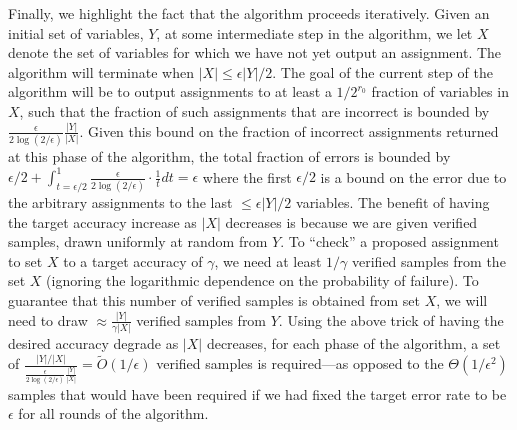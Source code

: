 \documentclass[final,12pt]{colt2018}
\newcommand{\eps}{\epsilon}
\begin{document}
Finally, we highlight the fact that the algorithm proceeds iteratively.  Given an initial set of variables, $Y$, at some intermediate step in the algorithm, we let $X$ denote the set of variables for which we have not yet output an assignment.   The algorithm will terminate when $|X| \le \eps |Y|/2$.  The goal of the current step of the algorithm will be to output assignments to at least a $1/2^{r_0}$ fraction of variables in $X$, such that the fraction of such assignments that are incorrect is bounded by $\frac{\eps}{2\log(2/\eps)} \frac{|Y|}{|X|}.$  Given this bound on the fraction of incorrect assignments returned at this phase of the algorithm, the total fraction of errors is  bounded by $\eps/2 + \int_{t=\eps/2}^1 \frac{\eps}{2\log(2/\eps)}\cdot \frac{1}{t} dt = \eps$  where the first $\eps/2$ is a bound on the error due to the arbitrary assignments to the last $\le \eps |Y|/2$ variables.    The benefit of having the target accuracy increase as $|X|$ decreases is because we are given verified samples, drawn uniformly at random from $Y$.  To ``check'' a proposed assignment to set $X$ to a target accuracy of $\gamma$, we need at least $1/\gamma$ verified samples from the set $X$  (ignoring the logarithmic dependence on the probability of failure).  To guarantee that this number of verified samples is obtained from set $X$, we will need to draw $\approx \frac{|Y|}{\gamma |X|}$   verified samples from $Y$.   Using the above trick of having the desired accuracy degrade as $|X|$ decreases, for each phase of the algorithm, a set of $\frac{|Y|/|X|}{\frac{\eps}{2\log(2/\eps)} \frac{|Y|}{|X|}} = \tilde{O}(1/\eps)$ verified samples is required---as opposed to the $\Theta(1/\eps^2)$ samples that would have been required if we had fixed the target error rate to be $\eps$ for all rounds of the algorithm.
\end{document}

